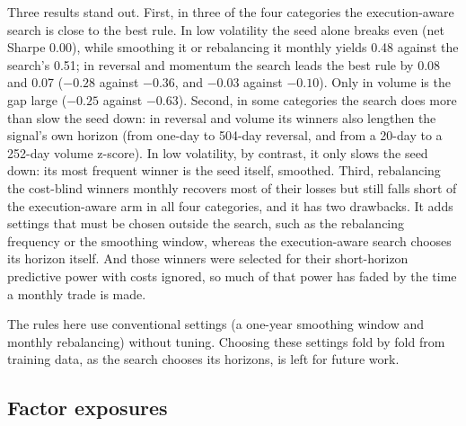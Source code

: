 \documentclass[preprint,12pt,authoryear]{elsarticle}
\begin{document}
Three results stand out. First, in three of the four categories the execution-aware search is close to the best rule. In low volatility the seed alone breaks even (net Sharpe 0.00), while smoothing it or rebalancing it monthly yields 0.48 against the search's 0.51; in reversal and momentum the search leads the best rule by 0.08 and 0.07 ($-0.28$ against $-0.36$, and $-0.03$ against $-0.10$). Only in volume is the gap large ($-0.25$ against $-0.63$). Second, in some categories the search does more than slow the seed down: in reversal and volume its winners also lengthen the signal's own horizon (from one-day to 504-day reversal, and from a 20-day to a 252-day volume z-score). In low volatility, by contrast, it only slows the seed down: its most frequent winner is the seed itself, smoothed. Third, rebalancing the cost-blind winners monthly recovers most of their losses but still falls short of the execution-aware arm in all four categories, and it has two drawbacks. It adds settings that must be chosen outside the search, such as the rebalancing frequency or the smoothing window, whereas the execution-aware search chooses its horizon itself. And those winners were selected for their short-horizon predictive power with costs ignored, so much of that power has faded by the time a monthly trade is made.

The rules here use conventional settings (a one-year smoothing window and monthly rebalancing) without tuning. Choosing these settings fold by fold from training data, as the search chooses its horizons, is left for future work.

\subsection{Factor exposures}\label{sec:spanning}
\end{document}
